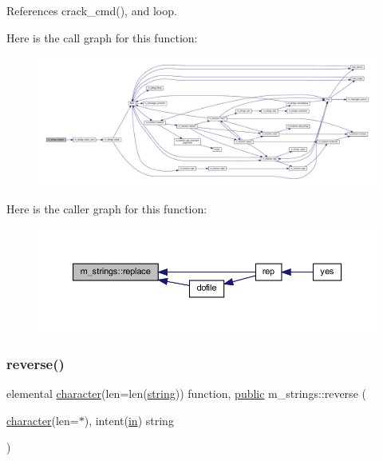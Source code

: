 References crack\+\_\+cmd(), and loop.

Here is the call graph for this function\+:
\nopagebreak
\begin{figure}[H]
\begin{center}
\leavevmode
\includegraphics[width=350pt]{namespacem__strings_a02d97675e95b9bd0ef3fd2abb9f2f435_cgraph}
\end{center}
\end{figure}
Here is the caller graph for this function\+:
\nopagebreak
\begin{figure}[H]
\begin{center}
\leavevmode
\includegraphics[width=350pt]{namespacem__strings_a02d97675e95b9bd0ef3fd2abb9f2f435_icgraph}
\end{center}
\end{figure}
\mbox{\label{namespacem__strings_ab3e5e7af9e9594fdb544f82736a26f17}} 
\subsubsection{\texorpdfstring{reverse()}{reverse()}}
{\footnotesize\ttfamily elemental \hyperlink{option__stopwatch_83_8txt_abd4b21fbbd175834027b5224bfe97e66}{character}(len=len(\hyperlink{what__overview_81_8txt_a74cb7e955273b9f9157b4f0c18a38849}{string})) function, \hyperlink{M__stopwatch_83_8txt_a2f74811300c361e53b430611a7d1769f}{public} m\+\_\+strings\+::reverse (\begin{DoxyParamCaption}\item[{\hyperlink{option__stopwatch_83_8txt_abd4b21fbbd175834027b5224bfe97e66}{character}(len=$\ast$), intent(\hyperlink{M__journal_83_8txt_afce72651d1eed785a2132bee863b2f38}{in})}]{string }\end{DoxyParamCaption})}




